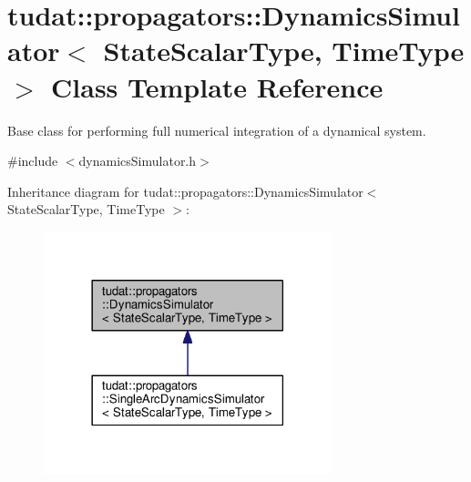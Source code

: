 \hypertarget{classtudat_1_1propagators_1_1DynamicsSimulator}{}\section{tudat\+:\+:propagators\+:\+:Dynamics\+Simulator$<$ State\+Scalar\+Type, Time\+Type $>$ Class Template Reference}
\label{classtudat_1_1propagators_1_1DynamicsSimulator}


Base class for performing full numerical integration of a dynamical system.  




{\ttfamily \#include $<$dynamics\+Simulator.\+h$>$}



Inheritance diagram for tudat\+:\+:propagators\+:\+:Dynamics\+Simulator$<$ State\+Scalar\+Type, Time\+Type $>$\+:
\nopagebreak
\begin{figure}[H]
\begin{center}
\leavevmode
\includegraphics[width=237pt]{classtudat_1_1propagators_1_1DynamicsSimulator__inherit__graph}
\end{center}
\end{figure}
